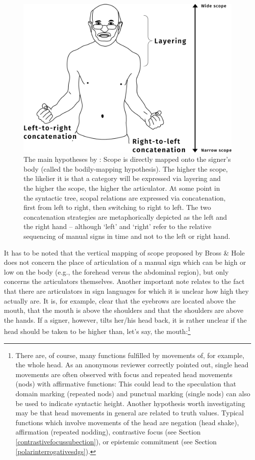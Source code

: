 \begin{figure}[bt]
\centering
	\includegraphics[width=1.0\textwidth]{hyposw.jpg}
	\caption{The main hypotheses by \citet{bross2017scope}: Scope is directly mapped onto the signer's body (called the bodily-mapping hypothesis). The higher the scope, the likelier it is that a category will be expressed via layering and the higher the scope, the higher the articulator. At some point in the syntactic tree, scopal relations are expressed via concatenation, first from left to right, then switching to right to left. The two concatenation strategies are metaphorically depicted as the left and the right hand -- although `left' and `right' refer to the relative sequencing of manual signs in time and not to the left or right hand.}
	\label{hypo}
\end{figure}	

\noindent It has to be noted that the vertical mapping of scope proposed by Bross \& Hole does not concern the place of articulation of a manual sign which can be high or low on the body (e.g., the forehead versus the abdominal region), but only concerns the articulators themselves. Another important note relates to the fact that there are articulators in sign languages for which it is unclear how high they actually are. It is, for example, clear that the eyebrows are located above the mouth, that the mouth is above the shoulders and that the shoulders are above the hands. If a signer, however, tilts her/his head back, it is rather unclear if the head should be taken to be higher than, let's say, the mouth:\footnote{ There are, of course, many functions fulfilled by movements of, for example, the whole head. As an anonymous reviewer correctly pointed out, single head movements are often observed with focus and repeated head movements (nods) with affirmative functions: This could lead to the speculation that domain marking (repeated nods) and punctual marking (single nods) can also be used to indicate syntactic height. Another hypothesis worth investigating may be that head movements in general are related to truth values. Typical functions which involve movements of the head are negation (head shake), affirmation (repeated nodding), contrastive focus (see Section \ref{contrastivefocussubection}), or epistemic commitment (see Section \ref{polarinterrogativesdgs}).}\label{nesting}

